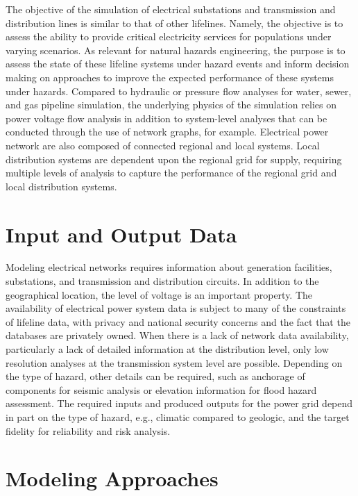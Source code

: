 The objective of the simulation of electrical substations and transmission and distribution lines is similar to that of other lifelines. Namely, the objective is to assess the ability to provide critical electricity services for populations under varying scenarios. As relevant for natural hazards engineering, the purpose is to assess the state of these lifeline systems under hazard events and inform decision making on approaches to improve the expected performance of these systems under hazards. Compared to hydraulic or pressure flow analyses for water, sewer, and gas pipeline simulation, the underlying physics of the simulation relies on power voltage flow analysis in addition to system-level analyses that can be conducted through the use of network graphs, for example. Electrical power network are also composed of connected regional and local systems. Local distribution systems are dependent upon the regional grid for supply, requiring multiple levels of analysis to capture the performance of the regional grid and local distribution systems.
 
\section{Input and Output Data}
\label{sec:perf_power_io}

Modeling electrical networks requires information about generation facilities, substations, and transmission and distribution circuits. In addition to the geographical location, the level of voltage is an important property. The availability of electrical power system data is subject to many of the constraints of lifeline data, with privacy and national security concerns and the fact that the databases are privately owned. When there is a lack of network data availability, particularly a lack of detailed information at the distribution level, only low resolution analyses at the transmission system level are possible. Depending on the type of hazard, other details can be required, such as anchorage of components for seismic analysis or elevation information for flood hazard assessment. The required inputs and produced outputs for the power grid depend in part on the type of hazard, e.g., climatic compared to geologic, and the target fidelity for reliability and risk analysis. 

\section{Modeling Approaches}
\label{sec:perf_power_methods}

